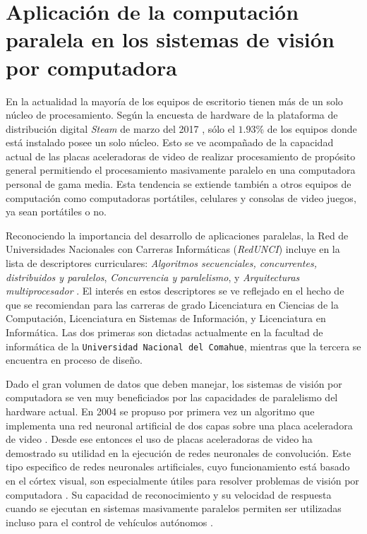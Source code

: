 \section{Aplicación de la computación paralela en los sistemas de visión por
computadora}

\label{algoritmosParalelosYVision}

En la actualidad la mayoría de los equipos de escritorio tienen más de un solo
núcleo de procesamiento. Según la encuesta de hardware de la plataforma de
distribución digital \emph{Steam} de marzo del 2017 \cite{steamSurvey}, sólo
el $1.93$\% de los equipos donde está instalado posee un solo núcleo. Esto se
ve acompañado de la capacidad actual de las placas aceleradoras de video de
realizar procesamiento de propósito general permitiendo el procesamiento
masivamente paralelo en una computadora personal de gama media. Esta tendencia
se extiende también a otros equipos de computación como computadoras
portátiles, celulares y consolas de video juegos, ya sean portátiles o no.

Reconociendo la importancia del desarrollo de aplicaciones paralelas, la Red
de Universidades Nacionales con Carreras Informáticas (\emph{RedUNCI}) incluye
en la lista de descriptores curriculares: \emph{Algoritmos secuenciales,
concurrentes, distribuidos y paralelos}, \emph{Concurrencia y paralelismo}, y
\emph{Arquitecturas multiprocesador} \cite{RedUNCI2015}. El interés en estos
descriptores se ve reflejado en el hecho de que se recomiendan para las
carreras de grado Licenciatura en Ciencias de la Computación, Licenciatura en
Sistemas de Información, y Licenciatura en Informática. Las dos primeras son
dictadas actualmente en la facultad de informática de la \texttt{Universidad
Nacional del Comahue}, mientras que la tercera se encuentra en proceso de
diseño.

Dado el gran volumen de datos que deben manejar, los sistemas de visión por
computadora se ven muy beneficiados por las capacidades de paralelismo del
hardware actual. En 2004 se propuso por primera vez un algoritmo que implementa
una red neuronal artificial de dos capas sobre una placa aceleradora de video
\cite{GPUforMLA}. Desde ese entonces el uso de placas aceleradoras de video ha
demostrado su utilidad en la ejecución de redes neuronales de convolución. Este
tipo especifico de redes neuronales artificiales, cuyo funcionamiento está
basado en el córtex visual, son especialmente útiles para resolver problemas de
visión por computadora \cite{usingCCN4IR2015}. Su capacidad de reconocimiento y
su velocidad de respuesta cuando se ejecutan en sistemas masivamente paralelos
permiten ser utilizadas incluso para el control de vehículos autónomos
\cite{e2eLearning4SDC}.

